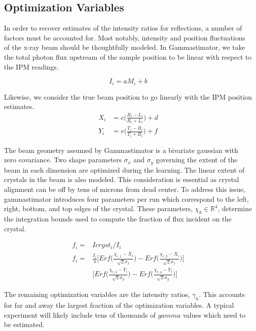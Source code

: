 \documentclass{report}
\begin{document}
\subsection{Optimization Variables}
In order to recover estimates of the intensity ratios for reflections, a number of factors must be accounted for. 
Most notably, intensity and position fluctuations of the x-ray beam should be thoughtfully modeled. 
In Gammastimator, we take the total photon flux upstream of the sample position to be linear with respect to the IPM readings.

\begin{equation}\label{eq:flux}
I_i = aM_i + b
\end{equation}

Likewise, we consider the true beam position to go linearly with the IPM position estimates.
\begin{align}
X_i &= c \bigg( \frac {R_i - L_i} {R_i + L_i}  \bigg) + d \\ \nonumber
Y_i &= e \bigg( \frac {T_i - B_i} {T_i + B_i}  \bigg) + f
\end{align}

The beam geometry assumed by Gammastimator is a bivariate gaussian with zero covariance. 
Two shape parameters $\sigma_x$ and $\sigma_y$ governing the extent of the beam in each dimension are optimized during the learning. 
The linear extent of crystals in the beam is also modeled. 
This consideration is essential as crystal alignment can be off by tens of microns from dead center. 
To address this issue, gammastimator introduces four parameters per run which correspond to the left, right, bottom, and top edges of the crystal. 
These parameters, $\chi_k \in \mathbb{R}^4$, determine the integration bounds used to compute the fraction of flux incident on the crystal. 

\begin{align}
f_i = &Icryst_i / I_i \nonumber \\
f_i = &\frac {I_i} {4}  \bigg[Erf\bigg(\frac{\chi_{r,1} - X_i} {\sqrt{2} \sigma_x}\bigg) - 
Erf\bigg(\frac{\chi_{r,2} - X_i} {\sqrt{2} \sigma_x}\bigg)\bigg] \nonumber \\ 
&\bigg[Erf\bigg(\frac{\chi_{r,3} - Y_i} {\sqrt{2} \sigma_y}\bigg) - Erf\bigg(\frac{\chi_{r,4} - Y_i} {\sqrt{2} \sigma_y}\bigg)\bigg] \nonumber
\end{align}

The remaining optimization variables are the intensity ratios, $\gamma_h$. 
This accounts for far and away the largest fraction of the optimization variables. 
A typical experiment will likely include tens of thousands of $gamma$ values which need to be estimated. 
\end{document}
